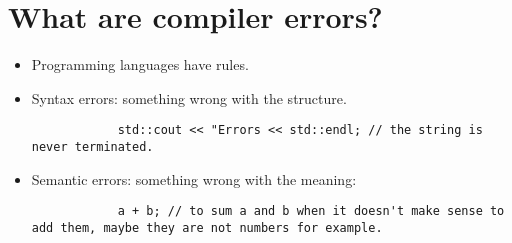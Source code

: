 \section{What are compiler errors?}
\begin{itemize}
    \item Programming languages have rules.
    \item Syntax errors: something wrong with the structure.
        \begin{verbatim}
            std::cout << "Errors << std::endl; // the string is never terminated.
        \end{verbatim}
    
    \item Semantic errors: something wrong with the meaning:
        \begin{verbatim}
            a + b; // to sum a and b when it doesn't make sense to add them, maybe they are not numbers for example.
        \end{verbatim}
\end{itemize}

